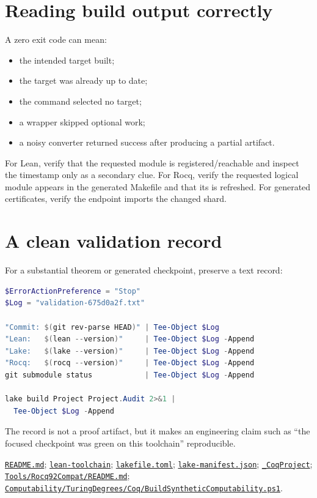 \documentclass[
  10pt,
  a4paper,
  twoside,
  open=any,
  parskip=half,
  headings=big
]{scrreprt}
\newcommand{\CommitFull}{675d0a2ff0fc624fba199e006049016ba806f40a}
\newcommand{\RepoBlobBase}{https://github.com/VladimirReshetnikov/ProveIt/blob/\CommitFull/}
\newcommand{\RepoFile}[1]{%
  \href{\RepoBlobBase\detokenize{#1}}{\nolinkurl{#1}}}
\newcommand{\code}[1]{\texttt{\detokenize{#1}}}
\begin{document}
\section{Reading build output correctly}

A zero exit code can mean:

\begin{itemize}
  \item the intended target built;
  \item the target was already up to date;
  \item the command selected no target;
  \item a wrapper skipped optional work;
  \item a noisy converter returned success after producing a partial artifact.
\end{itemize}

For Lean, verify that the requested module is registered/reachable and inspect
the \code{.olean} timestamp only as a secondary clue.  For Rocq, verify the
requested logical module appears in the generated Makefile and that its
\code{.vo} is refreshed.  For generated certificates, verify the endpoint
imports the changed shard.

\section{A clean validation record}

For a substantial theorem or generated checkpoint, preserve a text record:

\begin{lstlisting}[language=PowerShell]
$ErrorActionPreference = "Stop"
$Log = "validation-675d0a2f.txt"

"Commit: $(git rev-parse HEAD)" | Tee-Object $Log
"Lean:   $(lean --version)"     | Tee-Object $Log -Append
"Lake:   $(lake --version)"     | Tee-Object $Log -Append
"Rocq:   $(rocq --version)"     | Tee-Object $Log -Append
git submodule status            | Tee-Object $Log -Append

lake build Project Project.Audit 2>&1 |
  Tee-Object $Log -Append
\end{lstlisting}

The record is not a proof artifact, but it makes an engineering claim such as
``the focused checkpoint was green on this toolchain'' reproducible.

\begin{sourcebox}
\RepoFile{README.md};
\RepoFile{lean-toolchain};
\RepoFile{lakefile.toml};
\RepoFile{lake-manifest.json};
\RepoFile{_CoqProject};
\RepoFile{Tools/Rocq92Compat/README.md};
\RepoFile{Computability/TuringDegrees/Coq/BuildSyntheticComputability.ps1}.
\end{sourcebox}
\end{document}
